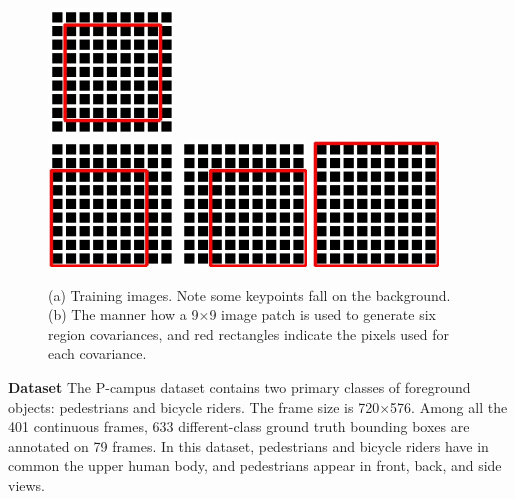\begin{figure}
{{\begin{minipage}[b]{0.4\textwidth}
\includegraphics[width=0.3\textwidth,bb=0 0 149 149]{dst5.jpg}  \\
\includegraphics[width=0.3\textwidth,bb=0 0 149 149]{dst2.jpg}
\includegraphics[width=0.3\textwidth,bb=0 0 149 149]{dst4.jpg}
\includegraphics[width=0.3\textwidth,bb=0 0 149 149]{dst1.jpg}
\end{minipage}
}
\label{fig:train:b}
}
\caption[Images for training]{(a) Training images. Note some keypoints fall on the background. (b) The manner how a 9$\times$9 image patch is used to generate six region covariances, and red rectangles indicate the pixels used for each covariance.}
\label{fig:train}
\end{figure}

\textbf{Dataset} The P-campus dataset contains two primary classes of foreground objects: pedestrians and bicycle riders. The frame size is 720$\times$576. Among all the 401 continuous frames, 633 different-class ground truth bounding boxes are annotated on 79 frames. In this dataset, pedestrians and bicycle riders have in common the upper human body, and pedestrians appear in front, back, and side views.

